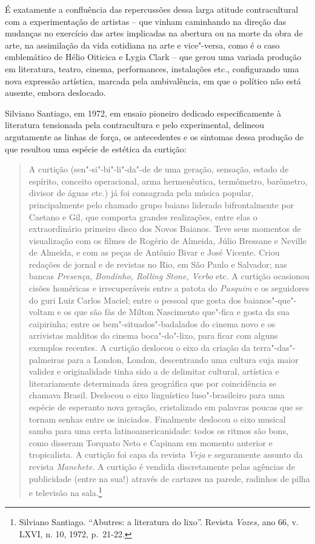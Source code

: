 É exatamente a confluência das repercussões dessa larga atitude
contracultural com a experimentação de artistas -- que vinham caminhando
na direção das mudanças no exercício das artes implicadas na abertura ou
na morte da obra de arte, na assimilação da vida cotidiana na arte e
vice"-versa, como é o caso emblemático de Hélio Oiticica e Lygia Clark --
que gerou uma variada produção em literatura, teatro, cinema,
performances, instalações etc., configurando uma nova expressão
artística, marcada pela ambivalência, em que o político não está
ausente, embora deslocado.

\asterisc

Silviano Santiago, em 1972, em ensaio pioneiro dedicado especificamente
à literatura tensionada pela contracultura e pelo experimental, delineou
argutamente as linhas de força, os antecedentes e os sintomas dessa
produção de que resultou uma espécie de estética da curtição:

\begin{quote}
A curtição (sen"-si"-bi"-li"-da"-de de uma geração, sensação, estado de
espírito, conceito operacional, arma hermenêutica, termômetro,
barômetro, divisor de águas etc.) já foi consagrada pela música popular,
principalmente pelo chamado grupo baiano liderado bifrontalmente por
Caetano e Gil, que comporta grandes realizações, entre elas o
extraordinário primeiro disco dos Novos Baianos. Teve seus momentos de
visualização com os filmes de Rogério de Almeida, Júlio Bressane e
Neville de Almeida, e com as peças de Antônio Bivar e José Vicente.
Criou redações de jornal e de revistas no Rio, em São Paulo e Salvador;
nas bancas \emph{Presença, Bondinho, Rolling Stone, Verbo} etc. A
curtição ocasionou cisões homéricas e irrecuperáveis entre a patota do
\emph{Pasquim} e os seguidores do guri Luiz Carlos Maciel; entre o
pessoal que gosta dos baianos"-que"-voltam e os que são fãs de Milton
Nascimento que"-fica e gosta da sua caipirinha; entre os
bem"-situados"-badalados do cinema novo e os arrivistas malditos do cinema
boca"-do"-lixo, para ficar com alguns exemplos recentes. A curtição
deslocou o eixo da criação da terra"-das"-palmeiras para a London, London,
descentrando uma cultura cuja maior validez e originalidade tinha sido a
de delimitar cultural, artística e literariamente determinada área
geográfica que por coincidência se chamava Brasil. Deslocou o eixo
linguístico luso"-brasileiro para uma espécie de esperanto nova geração,
cristalizado em palavras poucas que se tornam senhas entre os iniciados.
Finalmente deslocou o eixo musical samba para uma certa
latinoamericanidade: todos os ritmos são bons, como disseram Torquato
Neto e Capinam em momento anterior e tropicalista. A curtição foi capa
da revista \emph{Veja} e seguramente assunto da revista \emph{Manchete.} A
curtição é vendida discretamente pelas agências de publicidade (entre na
sua!) através de cartazes na parede, radinhos de pilha e televisão na
sala.\footnote{Silviano Santiago. ``Abutres: a literatura do lixo''.
  Revista \emph{Vozes,} ano 66, v. \textsc{LXVI}, n. 10, 1972, p.~21-22.}
\end{quote}

